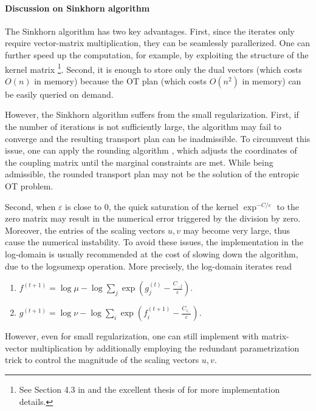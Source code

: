 
\paragraph{Discussion on Sinkhorn algorithm}
The Sinkhorn algorithm has two key advantages. First, since the iterates only require
vector-matrix multiplication, they can be seamlessly parallerized.
One can further speed up the computation,
for example, by exploiting the structure of the kernel matrix
\footnote{See Section 4.3 in \citep{Peyre19} and the excellent thesis of \citet{Feydy20} for more
implementation details.}. Second, it is enough to store only the dual vectors
(which costs $O(n)$ in memory) because the OT plan (which costs $O(n^2)$ in memory)
can be easily queried on demand.

However, the Sinkhorn algorithm suffers from the small regularization.
First, if the number of iterations is not sufficiently large,
the algorithm may fail to converge and the resulting transport plan can be inadmissible.
To circumvent this issue, one can apply the rounding algorithm \citep{Altschuler17},
which adjusts the coordinates of the coupling matrix until the marginal constraints are met.
While being admissible, the rounded transport plan may not be the solution of the entropic OT problem.

Second, when $\varepsilon$ is close to $0$, the quick saturation of the kernel
$\exp^{-C / \varepsilon}$ to the zero matrix may result in the numerical error triggered by the division by zero.
Moreover, the entries of the scaling vectors $u, v$ may become very large, thus cause the
numerical instability. To avoid these issues, the implementation in the log-domain
is usually recommended at the cost of slowing down the algorithm, due to the logsumexp operation.
More precisely, the log-domain iterates read
\begin{enumerate}
  \item $f^{(t+1)} = \log \mu - \log \sum_j \exp \left( g_j^{(t)} - \frac{C_{\cdot, j}}{\varepsilon} \right)$.
  \item $g^{(t+1)} = \log \nu - \log \sum_i \exp \left( f_i^{(t+1)} - \frac{C_{i, \cdot}}{\varepsilon} \right)$.
\end{enumerate}
However, even for small regularization, one can still implement with matrix-vector multiplication
by additionally employing the redundant parametrization trick \citep{Chizat18a,Schmitzer19}
to control the magnitude of the scaling vectors $u, v$.

